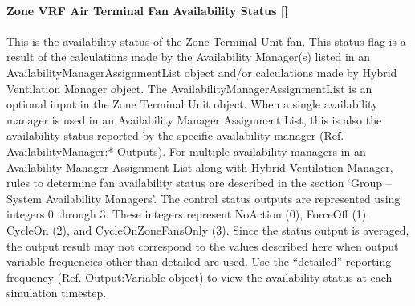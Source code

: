 \paragraph{Zone VRF Air Terminal Fan Availability Status {[]}}\label{zone-vrf-air-terminal-fan-availability-status}

This is the availability status of the Zone Terminal Unit fan. This status flag is a result of the calculations made by the Availability Manager(s) listed in an AvailabilityManagerAssignmentList object and/or calculations made by Hybrid Ventilation Manager object. The AvailabilityManagerAssignmentList is an optional input in the Zone Terminal Unit object. When a single availability manager is used in an Availability Manager Assignment List, this is also the availability status reported by the specific availability manager (Ref. AvailabilityManager:* Outputs). For multiple availability managers in an Availability Manager Assignment List along with Hybrid Ventilation Manager, rules to determine fan availability status are described in the section `Group -- System Availability Managers'. The control status outputs are represented using integers 0 through 3. These integers represent NoAction (0), ForceOff (1), CycleOn (2), and CycleOnZoneFansOnly (3). Since the status output is averaged, the output result may not correspond to the values described here when output variable frequencies other than detailed are used. Use the ``detailed'' reporting frequency (Ref. Output:Variable object) to view the availability status at each simulation timestep.
